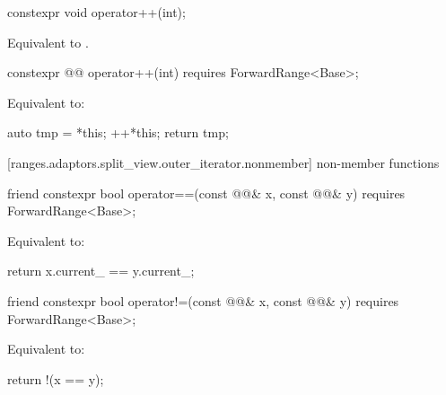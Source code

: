 %
\begin{itemdecl}
constexpr void operator++(int);
\end{itemdecl}

\begin{itemdescr}
\pnum
\effects Equivalent to .
\end{itemdescr}

%
\begin{itemdecl}
constexpr @@ operator++(int) requires ForwardRange<Base>;
\end{itemdecl}

\begin{itemdescr}
\pnum
\effects Equivalent to:
\begin{codeblock}
auto tmp = *this;
++*this;
return tmp;
\end{codeblock}
\end{itemdescr}

[ranges.adaptors.split_view.outer_iterator.nonmember]{ non-member functions}

%
\begin{itemdecl}
friend constexpr bool operator==(const @@& x, const @@& y)
requires ForwardRange<Base>;
\end{itemdecl}

\begin{itemdescr}
\pnum
\effects Equivalent to:
\begin{codeblock}
return x.current_ == y.current_;
\end{codeblock}
\end{itemdescr}

%
\begin{itemdecl}
friend constexpr bool operator!=(const @@& x, const @@& y)
requires ForwardRange<Base>;
\end{itemdecl}

\begin{itemdescr}
\pnum
\effects Equivalent to:
\begin{codeblock}
return !(x == y);
\end{codeblock}
\end{itemdescr}

